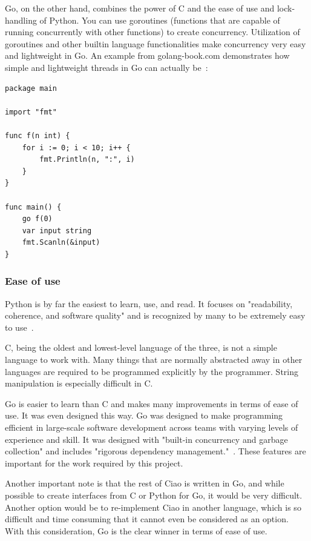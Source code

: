 \documentclass[10pt,letterpaper,onecolumn,draftclsnofoot]{IEEEtran}
\begin{document}
Go, on the other hand, combines the power of C and the ease of use and
lock-handling of Python. You can use goroutines (functions that are capable of
running concurrently with other functions) to create concurrency. Utilization of
goroutines and other builtin language functionalities make concurrency very easy
and lightweight in Go. An example from golang-book.com demonstrates how simple
and lightweight threads in Go can actually be~\cite{goroutines}:

\begin{lstlisting}
package main

import "fmt"

func f(n int) {
	for i := 0; i < 10; i++ {
		fmt.Println(n, ":", i)
	}
}

func main() {
	go f(0)
	var input string
	fmt.Scanln(&input)
}
\end{lstlisting}

\subsubsection{Ease of use}

Python is by far the easiest to learn, use, and read. It focuses on
"readability, coherence, and software quality" and is recognized by many to be
extremely easy to use~\cite{learningpython}.

C, being the oldest and lowest-level language of the three, is not a simple
language to work with. Many things that are normally abstracted away in other
languages are required to be programmed explicitly by the programmer. String
manipulation is especially difficult in C.

Go is easier to learn than C and makes many improvements in terms of ease of
use. It was even designed this way. Go was designed to make programming
efficient in large-scale software development across teams with varying levels
of experience and skill. It was designed with "built-in concurrency and garbage
collection" and includes "rigorous dependency management."~\cite{godesign}.
These features are important for the work required by this project.

Another important note is that the rest of Ciao is written in Go, and while
possible to create interfaces from C or Python for Go, it would be very
difficult. Another option would be to re-implement Ciao in another language,
which is so difficult and time consuming that it cannot even be considered as an
option. With this consideration, Go is the clear winner in terms of ease of use.
\end{document}
